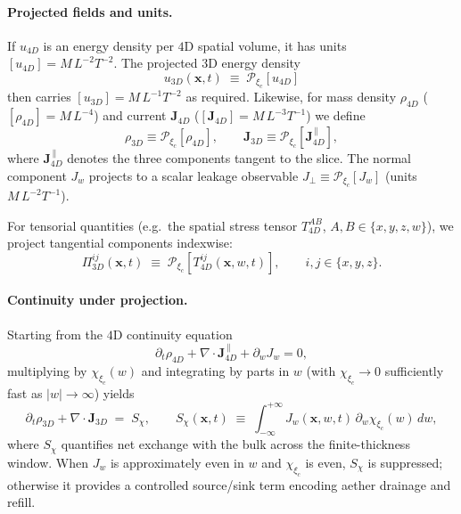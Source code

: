 \paragraph{Projected fields and units.}
If $u_{4D}$ is an energy density per $4$D spatial volume, it has units $[u_{4D}]=M\,L^{-2}T^{-2}$. The projected $3$D energy density
\begin{equation}
u_{3D}(\mathbf{x},t)\;\equiv\;\mathcal{P}_{\xi_c}[u_{4D}]
\label{eq:u_projection}
\end{equation}
then carries $[u_{3D}]=M\,L^{-1}T^{-2}$ as required. Likewise, for mass density $\rho_{4D}$ ($[\rho_{4D}]=M\,L^{-4}$) and current $\mathbf{J}_{4D}$ ($[\mathbf{J}_{4D}]=M\,L^{-3}T^{-1}$) we define
\begin{equation}
\rho_{3D}\equiv\mathcal{P}_{\xi_c}[\rho_{4D}],\qquad
\mathbf{J}_{3D}\equiv\mathcal{P}_{\xi_c}[\mathbf{J}_{4D}^{\,\parallel}],
\end{equation}
where $\mathbf{J}_{4D}^{\,\parallel}$ denotes the three components tangent to the slice. The normal component $J_w$ projects to a scalar leakage observable $J_{\perp}\equiv\mathcal{P}_{\xi_c}[J_w]$ (units $M\,L^{-2}T^{-1}$).

For tensorial quantities (e.g.\ the spatial stress tensor $T^{AB}_{4D}$, $A,B\in\{x,y,z,w\}$), we project tangential components indexwise:
\begin{equation}
\Pi^{ij}_{3D}(\mathbf{x},t)\;\equiv\;\mathcal{P}_{\xi_c}\!\left[T^{ij}_{4D}(\mathbf{x},w,t)\right],\qquad i,j\in\{x,y,z\}.
\label{eq:stress_projection}
\end{equation}

\paragraph{Continuity under projection.}
Starting from the $4$D continuity equation
\begin{equation}
\partial_t\rho_{4D}+\nabla\!\cdot\!\mathbf{J}_{4D}^{\,\parallel}+\partial_w J_w=0,
\label{eq:4d_continuity}
\end{equation}
multiplying by $\chi_{\xi_c}(w)$ and integrating by parts in $w$ (with $\chi_{\xi_c}\to 0$ sufficiently fast as $|w|\to\infty$) yields
\begin{equation}
\boxed{\;
\partial_t \rho_{3D}+\nabla\!\cdot\!\mathbf{J}_{3D}\;=\;S_{\chi},
\qquad
S_{\chi}(\mathbf{x},t)\;\equiv\;\int_{-\infty}^{+\infty}\! J_w(\mathbf{x},w,t)\,\partial_w \chi_{\xi_c}(w)\,dw,
\;}
\label{eq:projected_continuity}
\end{equation}
where $S_{\chi}$ quantifies net exchange with the bulk across the finite-thickness window. When $J_w$ is approximately even in $w$ and $\chi_{\xi_c}$ is even, $S_{\chi}$ is suppressed; otherwise it provides a controlled source/sink term encoding aether drainage and refill.

